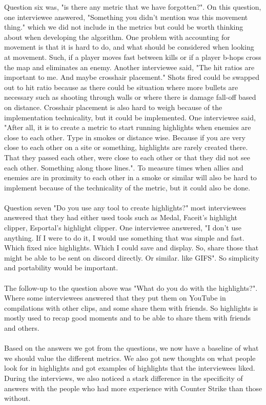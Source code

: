 Question six was, "is there any metric that we have forgotten?". On this question, one interviewee answered, "Something you didn't mention was this movement thing." which we did not include in the metrics but could be worth thinking about when developing the algorithm. One problem with accounting for movement is that it is hard to do, and what should be considered when looking at movement. Such, if a player moves fast between kills or if a player b-hops cross the map and eliminates an enemy. Another interviewee said, "The hit ratios are important to me. And maybe crosshair placement." Shots fired could be swapped out to hit ratio because as there could be situation where more bullets are necessary such as shooting through walls or where there is damage fall-off based on distance. Crosshair placement is also hard to weigh because of the implementation technicality, but it could be implemented. One interviewee said, "After all, it is to create a metric to start running highlights when enemies are close to each other. Type in smokes or distance wise. Because if you are very close to each other on a site or something, highlights are rarely created there. That they passed each other, were close to each other or that they did not see each other. Something along those lines.". To measure times when allies and enemies are in proximity to each other in a smoke or similar will also be hard to implement because of the technicality of the metric, but it could also be done. \\\\
Question seven "Do you use any tool to create highlights?" most interviewees answered that they had either used tools such as Medal, Faceit's highlight clipper, Esportal's highlight clipper. One interviewee answered, "I don't use anything. If I were to do it, I would use something that was simple and fast. Which fixed nice highlights. Which I could save and display. So, share those that might be able to be sent on discord directly. Or similar. like GIFS". So simplicity and portability would be important.\\\\
The follow-up to the question above was "What do you do with the highlights?". Where some interviewees answered that they put them on YouTube in compilations with other clips, and some share them with friends. So highlights is mostly used to recap good moments and to be able to share them with friends and others.\\\\
Based on the answers we got from the questions, we now have a baseline of what we should value the different metrics. We also got new thoughts on what people look for in highlights and got examples of highlights that the interviewees liked. During the interviews, we also noticed a stark difference in the specificity of answers with the people who had more experience with Counter Strike than those without. 
